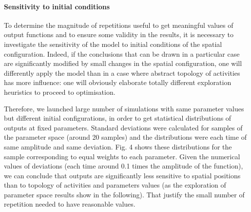 \documentclass[a4paper,twocolumn,twoside,10pt]{article}
\begin{document}
\paragraph{Sensitivity to initial conditions}

To determine the magnitude of repetitions useful to get meaningful
values of output functions and to ensure some validity in the results,
it is necessary to investigate the sensitivity of the model to initial
conditions of the spatial configuration. Indeed, if the conclusions
that can be drawn in a particular case are significantly modified
by small changes in the spatial configuration, one will differently
apply the model than in a case where abstract topology of activities
has more influence: one will obviously elaborate totally different
exploration heuristics to proceed to optimisation.

Therefore, we launched large number of simulations with same parameter
values but different initial configurations, in order to get statistical
distributions of outputs at fixed parameters. Standard deviations
were calculated for samples of the parameter space (around 20 samples)
and the distributions were each time of same amplitude and same deviation.
Fig. 4 shows these distributions for the sample corresponding to equal
weights to each parameter. Given the numerical values of deviations
(each time around 0.1 times the amplitude of the function), we can
conclude that outputs are significantly less sensitive to spatial
positions than to topology of activities and parameters values (as
the exploration of parameter space results show in the following).
That justify the small number of repetition needed to have reasonable
values.
\end{document}
